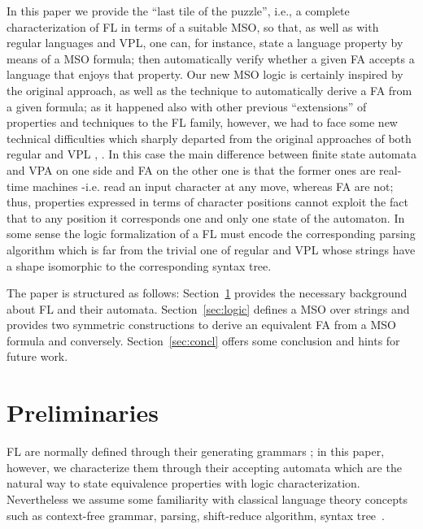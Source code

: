 \documentclass[10pt,a4paper,runningheads]{llncs}
\begin{document}
In this paper we provide the ``last tile of the puzzle'', i.e., a
complete characterization of FL in terms of a suitable MSO, so that,
as well as with regular languages and VPL, one can, for instance,
state a language property by means of a MSO formula; then
automatically verify whether a given FA accepts a language that enjoys
that property. Our new MSO logic is certainly inspired by the original
\cite{thomas90} approach, as well as the technique to automatically derive a
FA from a given formula; as it happened also with other previous
``extensions'' of properties and techniques to the FL family, however,
we had to face some new technical difficulties which sharply departed
from the original approaches of both regular and VPL \cite{thomas90},
\cite{jacm/AlurM09}. In this case the main difference between finite state
automata and VPA on one side and FA on the other one is that the
former ones are real-time machines -i.e. read an input character at
any move, whereas FA are not; thus, properties expressed in terms of
character positions cannot exploit the fact that to any position it
corresponds one and only one state of the automaton. In some sense the
logic formalization of a FL must encode the corresponding parsing
algorithm which is far from the trivial one of regular and VPL whose
strings have a shape isomorphic to the corresponding syntax tree.


The paper is structured as follows: Section~\ref{sec:prel} provides the
necessary background about FL and their
automata. Section~\ref{sec:logic} defines a MSO over strings and 
provides two symmetric constructions to derive an equivalent FA from a
MSO formula and conversely. Section~\ref{sec:concl} offers some
conclusion and hints for future work.



\section{Preliminaries}\label{sec:prel}


FL are normally defined through their generating grammars
\cite{Floyd1963,Fischer69}; in this paper, however, we
characterize them through their accepting automata
\cite{LMP10,LMP11} which are the natural way to state equivalence
properties with logic characterization. Nevertheless we assume some
familiarity with classical language theory concepts such as
context-free grammar, parsing, shift-reduce algorithm, syntax tree~\cite{GruneJacobs:08}.
\end{document}
